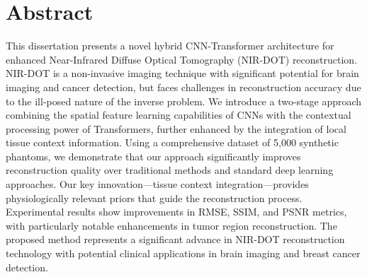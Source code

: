 
\chapter*{Abstract}

This dissertation presents a novel hybrid CNN-Transformer architecture for enhanced Near-Infrared Diffuse Optical Tomography (NIR-DOT) reconstruction. NIR-DOT is a non-invasive imaging technique with significant potential for brain imaging and cancer detection, but faces challenges in reconstruction accuracy due to the ill-posed nature of the inverse problem. We introduce a two-stage approach combining the spatial feature learning capabilities of CNNs with the contextual processing power of Transformers, further enhanced by the integration of local tissue context information. Using a comprehensive dataset of 5,000 synthetic phantoms, we demonstrate that our approach significantly improves reconstruction quality over traditional methods and standard deep learning approaches. Our key innovation—tissue context integration—provides physiologically relevant priors that guide the reconstruction process. Experimental results show improvements in RMSE, SSIM, and PSNR metrics, with particularly notable enhancements in tumor region reconstruction. The proposed method represents a significant advance in NIR-DOT reconstruction technology with potential clinical applications in brain imaging and breast cancer detection.